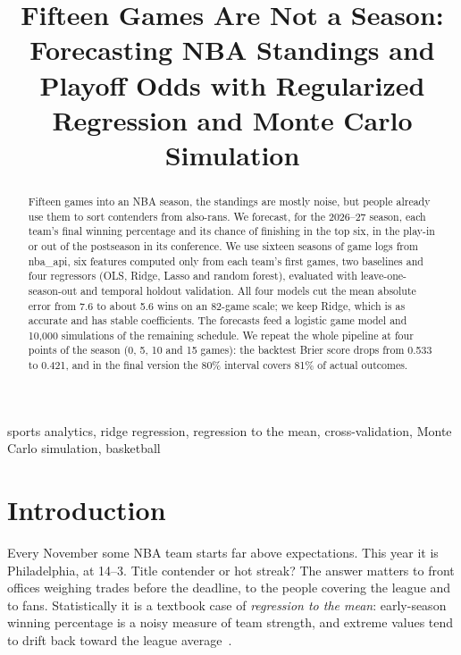 \documentclass[conference]{IEEEtran}
\begin{document}
\title{Fifteen Games Are Not a Season: Forecasting NBA Standings and Playoff Odds with Regularized Regression and Monte Carlo Simulation}

\author{
\and
{}
}

\maketitle

\begin{abstract}
Fifteen games into an NBA season, the standings are mostly noise, but people already use them to sort contenders from also-rans. We forecast, for the 2026--27 season, each team's final winning percentage and its chance of finishing in the top six, in the play-in or out of the postseason in its conference. We use sixteen seasons of game logs from nba\_api, six features computed only from each team's first games, two baselines and four regressors (OLS, Ridge, Lasso and random forest), evaluated with leave-one-season-out and temporal holdout validation. All four models cut the mean absolute error from 7.6 to about 5.6 wins on an 82-game scale; we keep Ridge, which is as accurate and has stable coefficients. The forecasts feed a logistic game model and 10,000 simulations of the remaining schedule. We repeat the whole pipeline at four points of the season (0, 5, 10 and 15 games): the backtest Brier score drops from 0.533 to 0.421, and in the final version the 80\% interval covers 81\% of actual outcomes.
\end{abstract}

\begin{IEEEkeywords}
sports analytics, ridge regression, regression to the mean, cross-validation, Monte Carlo simulation, basketball
\end{IEEEkeywords}

\section{Introduction}
Every November some NBA team starts far above expectations. This year it is Philadelphia, at 14--3. Title contender or hot streak? The answer matters to front offices weighing trades before the deadline, to the people covering the league and to fans. Statistically it is a textbook case of \emph{regression to the mean}: early-season winning percentage is a noisy measure of team strength, and extreme values tend to drift back toward the league average~\cite{efron1975,efron1977}.
\end{document}

